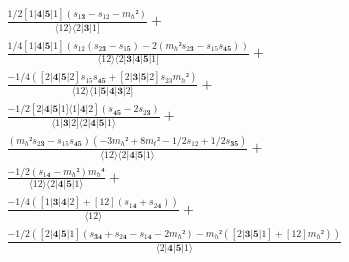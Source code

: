 \documentclass[varwidth, border=5pt]{standalone}
\begin{document}
\begin{my}
$\begin{gathered}
\scriptscriptstyle\frac{1/2[1|𝟒|𝟓|1](s_{1𝟑}-s_{12}-m_h²)}{⟨12⟩⟨2|𝟑|1]} +\\
\scriptscriptstyle\frac{1/4[1|𝟒|𝟓|1](s_{12}(s_{2𝟑}-s_{1𝟓})-2(m_h²s_{2𝟑}-s_{15}s_{𝟒𝟓}))}{⟨12⟩⟨2|𝟑|𝟒|𝟓|1]} +\\
\scriptscriptstyle\frac{-1/4([2|𝟒|𝟓|2]s_{15}s_{𝟒𝟓}+[2|𝟑|𝟓|2]s_{23}m_h²)}{⟨12⟩⟨1|𝟓|𝟒|𝟑|2]} +\\
\scriptscriptstyle\frac{-1/2[2|𝟒|𝟓|1]⟨1|𝟒|2](s_{𝟒𝟓}-2s_{2𝟑})}{⟨1|𝟑|2]⟨2|𝟒|𝟓|1⟩} +\\
\scriptscriptstyle\frac{(m_h²s_{2𝟑}-s_{15}s_{𝟒𝟓})(-3m_h²+8m_t²-1/2s_{12}+1/2s_{𝟑𝟓})}{⟨12⟩⟨2|𝟒|𝟓|1⟩} +\\
\scriptscriptstyle\frac{-1/2(s_{1𝟒}-m_h²)m_h⁴}{⟨12⟩⟨2|𝟒|𝟓|1⟩} +\\
\scriptscriptstyle\frac{-1/4([1|𝟑|𝟒|2]+[12](s_{1𝟒}+s_{2𝟒}))}{⟨12⟩} +\\
\scriptscriptstyle\frac{-1/2([2|𝟒|𝟓|1](s_{𝟑𝟒}+s_{2𝟒}-s_{1𝟒}-2m_h²)-m_h²([2|𝟑|𝟓|1]+[12]m_h²))}{⟨2|𝟒|𝟓|1⟩} \phantom{+}
\end{gathered}$
\end{my}
\end{document}
